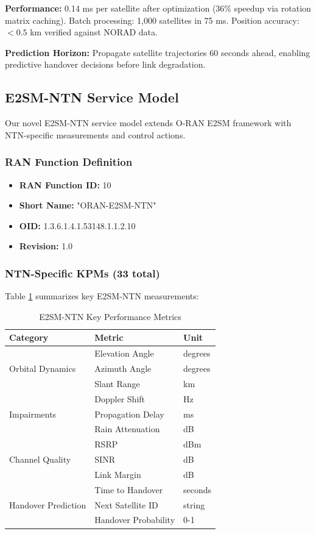 \documentclass[conference]{IEEEtran}
\begin{document}
\textbf{Performance:} 0.14 ms per satellite after optimization (36\% speedup via rotation matrix caching). Batch processing: 1,000 satellites in 75 ms. Position accuracy: $<0.5$ km verified against NORAD data.

\textbf{Prediction Horizon:} Propagate satellite trajectories 60 seconds ahead, enabling predictive handover decisions before link degradation.

\subsection{E2SM-NTN Service Model}

Our novel E2SM-NTN service model extends O-RAN E2SM framework with NTN-specific measurements and control actions.

\subsubsection{RAN Function Definition}

\begin{itemize}
    \item \textbf{RAN Function ID:} 10
    \item \textbf{Short Name:} "ORAN-E2SM-NTN"
    \item \textbf{OID:} 1.3.6.1.4.1.53148.1.1.2.10
    \item \textbf{Revision:} 1.0
\end{itemize}

\subsubsection{NTN-Specific KPMs (33 total)}

Table \ref{tab:kpms} summarizes key E2SM-NTN measurements:

\begin{table}[t]
\centering
\caption{E2SM-NTN Key Performance Metrics}
\label{tab:kpms}
\scriptsize
\begin{tabular}{@{}lll@{}}
\toprule
\textbf{Category} & \textbf{Metric} & \textbf{Unit} \\
\midrule
\multirow{3}{*}{Orbital Dynamics} & Elevation Angle & degrees \\
& Azimuth Angle & degrees \\
& Slant Range & km \\
\midrule
\multirow{3}{*}{Impairments} & Doppler Shift & Hz \\
& Propagation Delay & ms \\
& Rain Attenuation & dB \\
\midrule
\multirow{3}{*}{Channel Quality} & RSRP & dBm \\
& SINR & dB \\
& Link Margin & dB \\
\midrule
\multirow{3}{*}{Handover Prediction} & Time to Handover & seconds \\
& Next Satellite ID & string \\
& Handover Probability & 0-1 \\
\bottomrule
\end{tabular}
\end{table}
\end{document}
